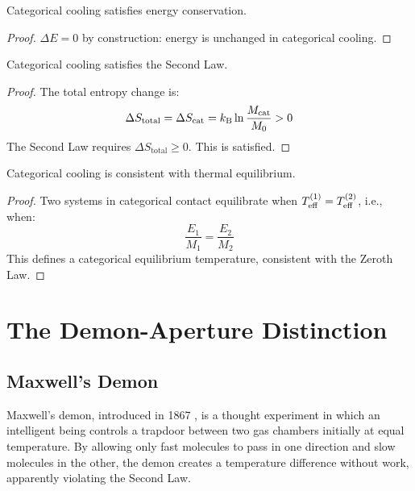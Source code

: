 \begin{proposition}
Categorical cooling satisfies energy conservation.
\end{proposition}

\begin{proof}
$\Delta E = 0$ by construction: energy is unchanged in categorical cooling.
\end{proof}

\begin{proposition}
Categorical cooling satisfies the Second Law.
\end{proposition}

\begin{proof}
The total entropy change is:
\begin{equation}
\Delta S_{\text{total}} = \Delta S_{\mathrm{cat}} = k_{\mathrm{B}} \ln \frac{M_{\mathrm{cat}}}{M_0} > 0
\end{equation}
The Second Law requires $\Delta S_{\text{total}} \geq 0$. This is satisfied.
\end{proof}

\begin{proposition}
Categorical cooling is consistent with thermal equilibrium.
\end{proposition}

\begin{proof}
Two systems in categorical contact equilibrate when $T_{\mathrm{eff}}^{(1)} = T_{\mathrm{eff}}^{(2)}$, i.e., when:
\begin{equation}
\frac{E_1}{M_1} = \frac{E_2}{M_2}
\end{equation}
This defines a categorical equilibrium temperature, consistent with the Zeroth Law.
\end{proof}

\section{The Demon-Aperture Distinction}

\subsection{Maxwell's Demon}

Maxwell's demon, introduced in 1867 \cite{maxwell1867}, is a thought experiment in which an intelligent being controls a trapdoor between two gas chambers initially at equal temperature. By allowing only fast molecules to pass in one direction and slow molecules in the other, the demon creates a temperature difference without work, apparently violating the Second Law.

